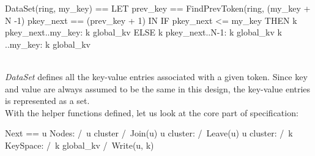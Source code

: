 \begin{tla}
DataSet(ring, my_key) == 
    LET 
        prev_key == FindPrevToken(ring, (my_key + N -1) %
        pkey_next == (prev_key + 1) %
    IN 
        IF pkey_next <= my_key THEN
            {k \in pkey_next..my_key: k \in global_kv}
        ELSE 
            {k \in pkey_next..N-1: k \in global_kv} \cup
            {k ..my_key: k \in global_kv}
\end{tla}
\begin{tlatex}
%
%
%
%
%
%
\end{tlatex}
\\

\textit{DataSet} defines all the key-value entries associated with a given
token. Since key and value are always assumed to be the same in this design, the
key-value entries is represented as a set.\\

With the helper functions defined, let us look at the core part of specification:\\
\begin{tla}
Next ==
    \/ \E u \in Nodes:
        /\ u \notin cluster
        /\ Join(u) 
    \/ \E u \in cluster:
        /\ Leave(u) 
    \/ \E u \in cluster:
        /\ \E k \in KeySpace:
            /\ k \notin global_kv
            /\ Write(u, k)
\end{tla}
\begin{tlatex}
%
%
%
%
%
%
%
%
%
%
\end{tlatex}
\\

